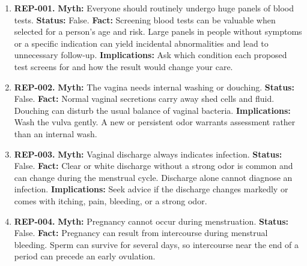 \documentclass[11pt,oneside]{book}
\begin{document}
\begin{enumerate}[leftmargin=0pt,labelwidth=0pt,labelsep=0pt,itemindent=0pt]
The following entries extend the registry with additional reproductive, pediatric, respiratory, dermatologic, aging, and treatment myths. The supporting source set includes women's-health and general medical myth guidance; individual claims should still be checked against current local recommendations \cite{ref13,ref11,ref12,ref14}.
\item[] \textbf{REP-001.} \textbf{Myth:} Everyone should routinely undergo huge panels of blood tests.\newline
\textbf{Status:} False.\newline
\textbf{Fact:} Screening blood tests can be valuable when selected for a person's age and risk. Large panels in people without symptoms or a specific indication can yield incidental abnormalities and lead to unnecessary follow-up. \cite{ref308}\newline
\textbf{Implications:} Ask which condition each proposed test screens for and how the result would change your care.
\item[] \textbf{REP-002.} \textbf{Myth:} The vagina needs internal washing or douching.\newline
\textbf{Status:} False.\newline
\textbf{Fact:} Normal vaginal secretions carry away shed cells and fluid. Douching can disturb the usual balance of vaginal bacteria. \cite{ref321}\newline
\textbf{Implications:} Wash the vulva gently. A new or persistent odor warrants assessment rather than an internal wash.
\item[] \textbf{REP-003.} \textbf{Myth:} Vaginal discharge always indicates infection.\newline
\textbf{Status:} False.\newline
\textbf{Fact:} Clear or white discharge without a strong odor is common and can change during the menstrual cycle. Discharge alone cannot diagnose an infection. \cite{ref322}\newline
\textbf{Implications:} Seek advice if the discharge changes markedly or comes with itching, pain, bleeding, or a strong odor.
\item[] \textbf{REP-004.} \textbf{Myth:} Pregnancy cannot occur during menstruation.\newline
\textbf{Status:} False.\newline
\textbf{Fact:} Pregnancy can result from intercourse during menstrual bleeding. Sperm can survive for several days, so intercourse near the end of a period can precede an early ovulation. \cite{ref253}\newline

\end{enumerate}
\end{document}

